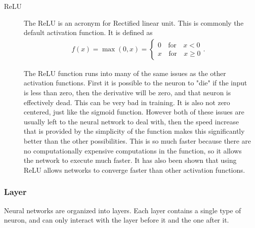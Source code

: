 \documentclass[10pt]{amsart}
\newenvironment{Figure}
{\par\medskip\noindent\minipage{\linewidth}}
{\endminipage\par\medskip}
\begin{document}
\begin{multicols}{2}
\begin{description}
    \item[ReLU] The ReLU is an acronym for Rectified linear unit. This is
      commonly the default activation function. It is defined as
      \begin{align*}
        f(x)=\max(0,x)=\begin{cases}
          0\quad\text{for}\quad x<0  \\ x\quad\text{for}\quad x\geq 0
        \end{cases}.
      \end{align*}
      \begin{Figure}
      \begin{center}
      \end{center}
      \label{fig:tanh}
      \end{Figure}
      The ReLU function runs into many of the same issues as the other
      activation functions. First it is possible to the neuron to "die" if the
      input is less than zero, then the derivative will be zero, and that
      neuron is effectively dead. This can be very bad in training. It is also
      not zero centered, just like the sigmoid function. However both of these
      issues are usually left to the neural network to deal with, then the
      speed increase that is provided by the simplicity of the function makes
      this significantly better than the other possibilities. This is so much
      faster because there are no computationally expensive computations in the
      function, so it allows the network to execute much faster. It has also
      been shown that using ReLU allows networks to converge faster than other
      activation functions.
  \end{description}

  \subsubsection{Layer}%
  \label{ssub:layer}

  Neural networks are organized into layers. Each layer contains a single type
  of neuron, and can only interact with the layer before it and the one after
  it.


\end{multicols}
\end{document}

